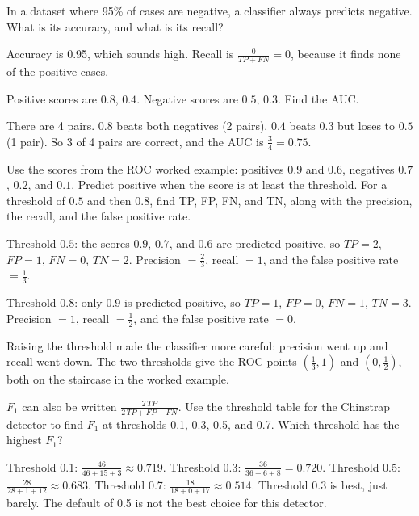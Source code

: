 \begin{Exercise}[label=conf3, title=Accuracy can mislead]
In a dataset where 95\% of cases are negative, a classifier always predicts negative. What is its accuracy, and what is its recall?
\end{Exercise}
\begin{Answer}[ref=conf3]
Accuracy is 0.95, which sounds high. Recall is $\frac{0}{TP + FN} = 0$, because it
finds none of the positive cases.
\end{Answer}

\begin{Exercise}[label=prc1, title=Compute the AUC]
Positive scores are $0.8$, $0.4$. Negative scores are $0.5$, $0.3$. Find the AUC.
\end{Exercise}
\begin{Answer}[ref=prc1]
There are 4 pairs. $0.8$ beats both negatives (2 pairs). $0.4$ beats $0.3$ but loses to $0.5$ (1 pair).
So 3 of 4 pairs are correct, and the AUC is $\frac{3}{4} = 0.75$.
\end{Answer}

\begin{Exercise}[label=prc3, title=Moving the threshold]
Use the scores from the ROC worked example: positives $0.9$ and $0.6$, negatives
$0.7$, $0.2$, and $0.1$. Predict positive when the score is at least the threshold.
For a threshold of $0.5$ and then $0.8$, find TP, FP, FN, and TN, along with the
precision, the recall, and the false positive rate.
\end{Exercise}
\begin{Answer}[ref=prc3]
Threshold $0.5$: the scores $0.9$, $0.7$, and $0.6$ are predicted positive, so
$TP = 2$, $FP = 1$, $FN = 0$, $TN = 2$. Precision $= \frac{2}{3}$, recall $= 1$,
and the false positive rate $= \frac{1}{3}$.

Threshold $0.8$: only $0.9$ is predicted positive, so $TP = 1$, $FP = 0$, $FN = 1$,
$TN = 3$. Precision $= 1$, recall $= \frac{1}{2}$, and the false positive rate $= 0$.

Raising the threshold made the classifier more careful: precision went up and
recall went down. The two thresholds give the ROC points $(\frac{1}{3}, 1)$ and
$(0, \frac{1}{2})$, both on the staircase in the worked example.
\end{Answer}

\begin{Exercise}[label=conf4, title={The best F1}, space=3cm]
$F_1$ can also be written $\frac{2\,TP}{2\,TP + FP + FN}$. Use the threshold table for the Chinstrap detector to
find $F_1$ at thresholds 0.1, 0.3, 0.5, and 0.7. Which threshold has the highest $F_1$?
\end{Exercise}
\begin{Answer}[ref=conf4]
Threshold 0.1: $\frac{46}{46 + 15 + 3} \approx 0.719$. Threshold 0.3: $\frac{36}{36 + 6 + 8} = 0.720$.
Threshold 0.5: $\frac{28}{28 + 1 + 12} \approx 0.683$. Threshold 0.7: $\frac{18}{18 + 0 + 17} \approx 0.514$.
Threshold 0.3 is best, just barely. The default of 0.5 is not the best choice for this detector.
\end{Answer}

